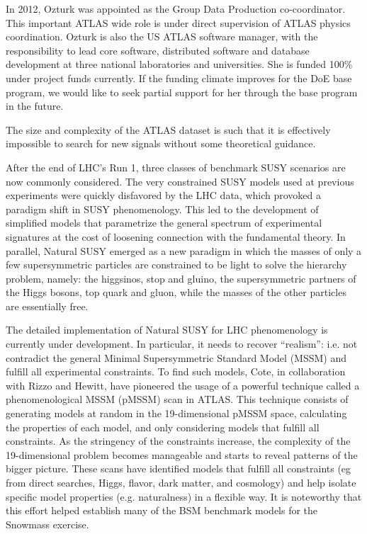 In 2012, Ozturk was appointed as the Group Data Production
co-coordinator. This important ATLAS wide role is under direct
supervision of ATLAS physics coordination. Ozturk is also the US ATLAS
software manager, with the responsibility to lead core software,
distributed software and database development at three national
laboratories and universities. She is funded 100\% under project funds
currently. If the funding climate improves for the DoE base program,
we would like to seek partial support for her through the base program
in the future.


 The size and complexity of the ATLAS
dataset is such that it is effectively impossible to search for new
signals without some theoretical guidance.

After the end of LHC's Run 1, three classes of benchmark SUSY
scenarios are now commonly considered. The very constrained SUSY
models used at previous experiments were quickly disfavored by the LHC
data, which provoked a paradigm shift in SUSY phenomenology. This led
to the development of simplified models that parametrize the general
spectrum of experimental signatures at the cost of loosening
connection with the fundamental theory. In parallel, Natural SUSY
emerged as a new paradigm in which the masses of only a few
supersymmetric particles are constrained to be light to solve the
hierarchy problem, namely: the higgsinos, stop and gluino, the
supersymmetric partners of the Higgs bosons, top quark and gluon,
while the masses of the other particles are essentially free.

The detailed implementation of Natural SUSY for LHC phenomenology is
currently under development. In particular, it needs to recover
``realism'': i.e. not contradict the general Minimal Supersymmetric
Standard Model (MSSM) and fulfill all experimental constraints.  To
find such models, Cote, in collaboration with Rizzo and Hewitt, have
pioneered the usage of a powerful technique called a phenomenological
MSSM (pMSSM) scan\cite{Cahill-Rowley:2013yla} in ATLAS. This technique consists of
generating models at random in the 19-dimensional pMSSM space,
calculating the properties of each model, and only considering models
that fulfill all constraints.  As the stringency of the constraints
increase, the complexity of the 19-dimensional problem becomes
manageable and starts to reveal patterns of the bigger picture. These
scans have identified models that fulfill all constraints (eg from
direct searches, Higgs, flavor, dark matter, and cosmology) and help
isolate specific model properties (e.g. naturalness) in a flexible
way.  It is noteworthy that this effort helped establish many of the
BSM benchmark models for the Snowmass exercise.

